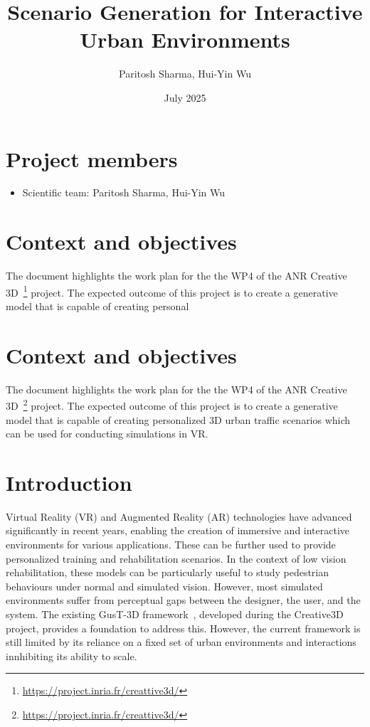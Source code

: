 \documentclass{article}
\title{Scenario Generation for Interactive Urban Environments}
\author{Paritosh Sharma, Hui-Yin Wu}
\date{July 2025}
\begin{document}
\maketitle

\section*{Project members}

\begin{itemize}
    \item Scientific team: Paritosh Sharma, Hui-Yin Wu
\end{itemize}

\section{Context and objectives}

The document highlights the work plan for the the WP4 of the ANR Creative 3D~\footnote{\url{https://project.inria.fr/creattive3d/}} project. The expected outcome of this project is to create a generative model that is capable of creating personal
\section{Context and objectives}

The document highlights the work plan for the the WP4 of the ANR Creative 3D~\footnote{\url{https://project.inria.fr/creattive3d/}} project. The expected outcome of this project is to create a generative model that is capable of creating personalized 3D urban traffic scenarios which can be used for conducting simulations in VR.

\section{Introduction}

Virtual Reality (VR) and Augmented Reality (AR) technologies have advanced significantly in recent years, enabling the creation of immersive and interactive environments for various applications. These can be further used to provide personalized training and rehabilitation scenarios. In the context of low vision rehabilitation, these models can be particularly useful to study pedestrian behaviours under normal and simulated vision. However, most simulated environments suffer from perceptual gaps between the designer, the user, and the system. The existing GusT-3D framework~\cite{wu2022designing}, developed during the Creative3D project, provides a foundation to address this. However, the current framework is still limited by its reliance on a fixed set of urban environments and interactions innhibiting its ability to scale.
\end{document}
